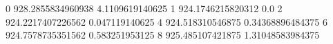 0 928.2855834960938 4.1109619140625
1 924.1746215820312 0.0
2 924.2217407226562 0.047119140625
4 924.518310546875 0.34368896484375
6 924.7578735351562 0.583251953125
8 925.485107421875 1.31048583984375
